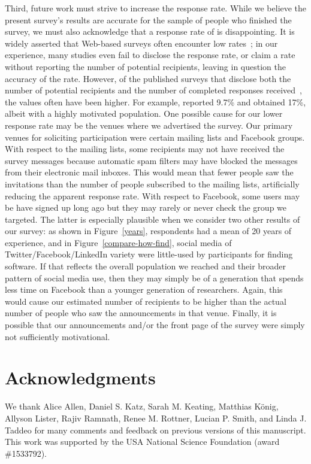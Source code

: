 \documentclass[review]{elsarticle}
\begin{document}
Third, future work must strive to increase the response rate.  While we believe the present survey's results are accurate for the sample of people who finished the survey, we must also acknowledge that a response rate of \populationResponseRate is disappointing.  It is widely asserted that Web-based surveys often encounter low rates~\cite[e.g.,][]{kitchenham_2008, couper2000review, couper2008web}; in our experience, many studies even fail to disclose the response rate, or claim a rate without reporting the number of potential recipients, leaving in question the accuracy of the rate.  However, of the published surveys that disclose both the number of potential recipients and the number of completed responses received~\cite[e.g.,][]{wu2007empirical, bauer2014exploratory, kalliamvakou_2014, lawrence2015science, sojer2010reusing}, the values often have been higher.  For example, \citet{sojer2010reusing} reported 9.7\% and \citet{lawrence2015science} obtained 17\%, albeit with a highly motivated population.  One possible cause for our lower response rate may be the venues where we advertised the survey.  Our primary venues for soliciting participation were certain mailing lists and Facebook groups.  With respect to the mailing lists, some recipients may not have received the survey messages because automatic spam filters may have blocked the messages from their electronic mail inboxes.  This would mean that fewer people saw the invitations than the number of people subscribed to the mailing lists, artificially reducing the apparent response rate.  With respect to Facebook, some users may be have signed up long ago but they may rarely or never check the group we targeted.  The latter is especially plausible when we consider two other results of our survey: as shown in Figure~\ref{years}, respondents had a mean of 20 years of experience, and in Figure~\ref{compare-how-find}, social media of Twitter/Facebook/LinkedIn variety were little-used by participants for finding software.  If that reflects the overall population we reached and their broader pattern of social media use, then they may simply be of a generation that spends less time on Facebook than a younger generation of researchers.  Again, this would cause our estimated number of recipients to be higher than the actual number of people who saw the announcements in that venue.  Finally, it is possible that our announcements and/or the front page of the survey were simply not sufficiently motivational.


\section{Acknowledgments}

We thank
Alice Allen,
Daniel S. Katz,
Sarah M. Keating,
Matthias K\"{o}nig,
Allyson Lister,
Rajiv Ramnath,
Renee M. Rottner,
Lucian P. Smith, and
Linda J. Taddeo
for many comments and feedback on previous versions of this manuscript.
This work was supported by the USA National Science Foundation (award \#1533792).




\end{document}
